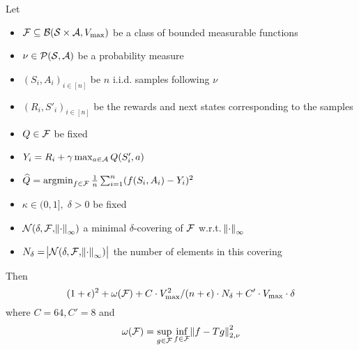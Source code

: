 
\begin{thm}\label{thm:oneStep}
  Let
  \begin{itemize}
    \item $\mathcal{F} \subseteq \mathcal{B}(\mathcal{S}\times\mathcal{A}, V_{\max})$
      be a class of bounded measurable functions
    \item $\nu \in \mathcal{P}(\mathcal{S},\mathcal{A})$ be a probability measure
    \item $(S_i, A_i)_{i\in[n]}$ be $n$ i.i.d. samples following $\nu$
    \item $(R_i, S'_i)_{i\in[n]}$ be the rewards and next states
    	corresponding to the samples
    \item $Q \in \mathcal{F}$ be fixed
    \item $Y_i = R_i + \gamma \max_{a \in \mathcal{A}} Q(S'_i, a)$
    \item $\widehat{Q} = \operatorname*{argmin}_{f \in \mathcal{F}} \frac{1}{n}
      \sum_{i=1}^n (f(S_i, A_i) - Y_i)^2$
    \item $\kappa \in (0,1],\; \delta > 0$ be fixed
    \item $\mathcal{N}(\delta, \mathcal{F}, \norm{\cdot}_\infty)$
      a minimal $\delta$-covering of $\mathcal{F}$ w.r.t. $\norm{\cdot}_\infty$
    \item $N_\delta = \abs{\mathcal{N}(\delta, \mathcal{F}, \norm{\cdot}_\infty)}$
      the number of elements in this covering
  \end{itemize}
  Then
  \[(1+\epsilon)^2+\omega(\mathcal{F})+C\cdot V_{\max}^2/(n+\epsilon)\cdot N_\delta
  + C' \cdot V_{\max} \cdot \delta \]
  where $C = 64, C'=8$ and
  \[ \omega(\mathcal{F})
  = \sup_{g\in \mathcal{F}} \inf_{f \in \mathcal{F}} \norm{f - T g}_{2, \nu}^2 \]
\end{thm}
